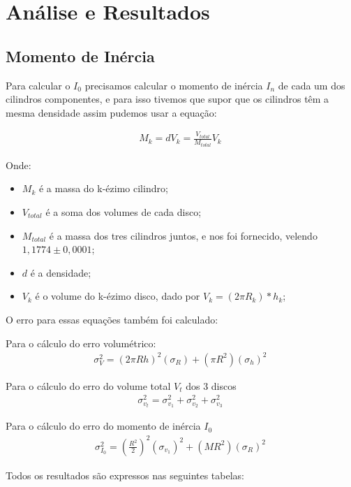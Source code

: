 \documentclass[a4paper]{article}
\begin{document}
\section{Análise e Resultados}

\subsection{Momento de Inércia}
Para calcular o $I_0$ precisamos calcular o momento de inércia $I_n$ de cada um dos cilindros componentes, e para isso tivemos que supor que os cilindros têm a mesma densidade assim pudemos usar a equação:

\begin{align}
	M_k = d V_k = \frac{V_{total}}{M_{total}} V_k\
	\label{eq:MassaDisco}
\end{align}

Onde:
\begin{itemize}
	\item $M_k$ é a massa do k-ézimo cilindro;
	\item $V_{total}$ é a soma dos volumes de cada disco;
	\item $M_{total}$ é a massa dos tres cilindros juntos, e nos foi fornecido, velendo $1,1774\pm0,0001$;
	\item $d$ é a densidade;
	\item $V_k$ é o volume do k-ézimo disco, dado por $V_k = (2 \pi R_k) * h_k$;
\end{itemize}

O erro para essas equações também foi calculado:

Para o cálculo do erro volumétrico:
\begin{align}
   \sigma_V^2 = (2 \pi R h)^2(\sigma_R)+(\pi R^2)(\sigma_h)^2 \
   \label{eq:ErroVolume}
\end{align}

Para o cálculo do erro do volume total $V_t$ dos 3 discos
\begin{align}
   \sigma_{v_t}^2 = \sigma_{v_1}^2 + \sigma_{v_2}^2 + \sigma_{v_3}^2\
   \label{eq:ErroVolumeTotal}
\end{align}

Para o cálculo do erro do momento de inércia $I_0$
\begin{align}
   \sigma_{I_0}^2 = (\frac{R^2}{2})^2 (\sigma_{v_1})^2 +(M R^2)(\sigma_R)^2\
   \label{eq:MomentoInercia}
\end{align}

Todos os resultados são expressos nas seguintes tabelas:
\end{document}
